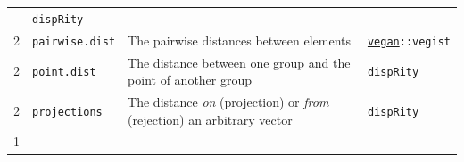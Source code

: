 \documentclass[
]{book}
\begin{document}
\begin{longtable}[]{@{}llll@{}}
\begin{minipage}[t]{0.64\columnwidth}
\end{minipage} & \begin{minipage}[t]{0.10\columnwidth}\raggedright
\texttt{dispRity}\strut
\end{minipage}\tabularnewline
\begin{minipage}[t]{0.07\columnwidth}\raggedright
2\strut
\end{minipage} & \begin{minipage}[t]{0.07\columnwidth}\raggedright
\texttt{pairwise.dist}\strut
\end{minipage} & \begin{minipage}[t]{0.64\columnwidth}\raggedright
The pairwise distances between elements\strut
\end{minipage} & \begin{minipage}[t]{0.10\columnwidth}\raggedright
\href{https://cran.r-project.org/web/packages/vegan/index.html}{\texttt{vegan}}\texttt{::vegist}\strut
\end{minipage}\tabularnewline
\begin{minipage}[t]{0.07\columnwidth}\raggedright
2\strut
\end{minipage} & \begin{minipage}[t]{0.07\columnwidth}\raggedright
\texttt{point.dist}\strut
\end{minipage} & \begin{minipage}[t]{0.64\columnwidth}\raggedright
The distance between one group and the point of another group\strut
\end{minipage} & \begin{minipage}[t]{0.10\columnwidth}\raggedright
\texttt{dispRity}\strut
\end{minipage}\tabularnewline
\begin{minipage}[t]{0.07\columnwidth}\raggedright
2\strut
\end{minipage} & \begin{minipage}[t]{0.07\columnwidth}\raggedright
\texttt{projections}\strut
\end{minipage} & \begin{minipage}[t]{0.64\columnwidth}\raggedright
The distance \emph{on} (projection) or \emph{from} (rejection) an arbitrary vector\strut
\end{minipage} & \begin{minipage}[t]{0.10\columnwidth}\raggedright
\texttt{dispRity}\strut
\end{minipage}\tabularnewline
\begin{minipage}[t]{0.07\columnwidth}\raggedright
1\strut

\end{minipage}
\end{longtable}
\end{document}
